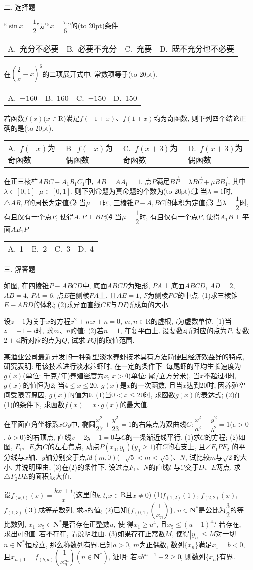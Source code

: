 \documentclass[10pt,a4paper]{article}
\newcommand{\bracket}[1]{(\hbox to #1pt{})}
\newcommand{\fourch}[4]{\par\begin{tabular}{p{.23\textwidth}p{.23\textwidth}p{.23\textwidth}p{.23\textwidth}}
A.~#1 &B.~#2& C.~#3& D.~#4
\end{tabular}}
\begin{document}
二. 选择题
\item ``$\sin x=\dfrac 12$''是``$x=\dfrac{\pi }6$''的\bracket{20}条件
\fourch{充分不必要}{必要不充分}{充要}{既不充分也不必要}
\item 在$(\dfrac 2x-x)^6$的二项展开式中, 常数项等于\bracket{20}.
\fourch{$-160$}{160}{$-150$}{150}
\item 若函数$f(x)$($x\in$R)满足$f(-1+x)$、$f(1+x)$均为奇函数, 则下列四个结论正确的是\bracket{20}.
\fourch{$f(-x)$为奇函数}{$f(-x)$为偶函数}{$f(x+3)$为奇函数}{$f(x+3)$为偶函数}
\item 在正三棱柱$ABC-A_1B_1C_1$中, $AB=AA_1=1$, 点$P$满足$\overrightarrow{BP}=\lambda \overrightarrow{BC}+\mu \overrightarrow{BB_1}$, 其中$\lambda \in [0,1]$, $\mu \in [0,1]$, 则下列命题为真命题的个数为\bracket{20}.
\textcircled{1} 当$\lambda =1$时, $\triangle AB_1P$的周长为定值;
\textcircled{2} 当$\mu =1$时, 三棱锥$P-A_1BC$的体积为定值;
\textcircled{3} 当$\lambda =\dfrac 12$时, 有且仅有一个点$P$, 使得$A_1P\perp BP$;
\textcircled{4} 当$\mu =\dfrac 12$时, 有且仅有一个点$P$, 使得$A_1B\perp$平面$AB_1P$
\fourch{1}{2}{3}{4}
三. 解答题
\item 如图, 在四棱锥$P-ABCD$中, 底面$ABCD$为矩形, $PA\perp$底面$ABCD$, $AD=2$, $AB=4$, $PA=6$, 点$E$在侧棱$PA$上, 且$AE=1$, $F$为侧棱$PC$的中点.
(1)求三棱锥$E-ABD$的体积;
(2)求异面直线$CE$与$DF$所成角的大小.
\item 设$z+1$为关于$x$的方程$x^2+mx+n=0$, $m,n\in$R的虚根, $i$为虚数单位.
(1)当$z=-1+i$时, 求$m$、$n$的值;
(2)若$n=1$, 在复平面上, 设复数$z$所对应的点为$P$, 复数$2+4\mathrm{i}$所对应的点为$Q$, 试求$|PQ|$的取值范围.
\item 某渔业公司最近开发的一种新型淡水养虾技术具有方法简便且经济效益好的特点, 研究表明: 用该技术进行淡水养虾时, 在一定的条件下, 每尾虾的平均生长速度为$g(x)$(单位: 千克/年)养殖密度为$x$, $x>0$(单位: 尾/立方分米), 当$x$不超过4时, $g(x)$的值恒为2; 当$4\le x\le 20$, $g(x)$是$x$的一次函数, 且当$x$达到20时, 因养殖空间受限等原因, $g(x)$的值为0.
(1)当$0<x\le 20$时, 求函数$g(x)$的表达式;
(2)在(1)的条件下, 求函数$f(x)=x\cdot g(x)$的最大值.
\item 在平面直角坐标系$xOy$中, 椭圆$\dfrac{x^2}{27}+\dfrac{y^2}{23}=1$的右焦点为双曲线$C:\dfrac{x^2}{a^2}-\dfrac{y^2}{b^2}=1$($a>0$,
$b>0$)的右顶点, 直线$x+2y+1=0$与$C$的一条渐近线平行.
(1)求$C$的方程;
(2)如图, $F_1$、$F_2$为$C$的左右焦点, 动点$P(x_0,y_0)$($y_0\ge 1$)在$C$的右支上, 且$\angle F_1PF_2$
的平分线与$x$轴、$y$轴分别交于点$M(m,0)$($-\sqrt 5<m<\sqrt 5$)、$N$, 试比较$m$与$\sqrt 2$的大
小, 并说明理由;
(3)在(2)的条件下, 设过点$F_1$、$N$的直线$l$
与$C$交于$D$、$E$两点, 求$\triangle F_2DE$的面积最大值.
\item 设$f_{(k,t)}(x)=\dfrac{kx+t}x$(这里的$k,t,x\in$R且$x\ne 0$)
(1)$f_{(1,2)}(1)$, $f_{(2,2)}(x)$, $f_{(1,3)}(3)$成等差数列, 求$x$的值;
(2)已知$\{f_{(0,1)}(\dfrac 1{x_n})\}$, $n\in \mathbf{N}^*$是公比为$\dfrac 32$的等比数列, $x_1,x_5\in \mathbf{N}^*$是否存在正整数$u$, 使
得$x_1\ge u^4$, 且$x_5\le (u+1)^4$? 若存在, 求出$u$的值, 若不存在, 请说明理由.
(3)如果存在正常数$M$, 使得$|y_n|\le M$对一切$n\in \mathbf{N}^*$恒成立, 那么称数列有界.已知$a>0$, $m$为正偶数, 数列$\{x_n\}$满足$x_1=b<0$, 且$x_{n+1}=f_{(b,a)}(\dfrac 1{x_n^m})(n\in \mathbf{N}^*)$, 证明: 若$ab^{m-1}+2\ge 0$, 则数列$\{x_n\}$有界.
\end{document}
